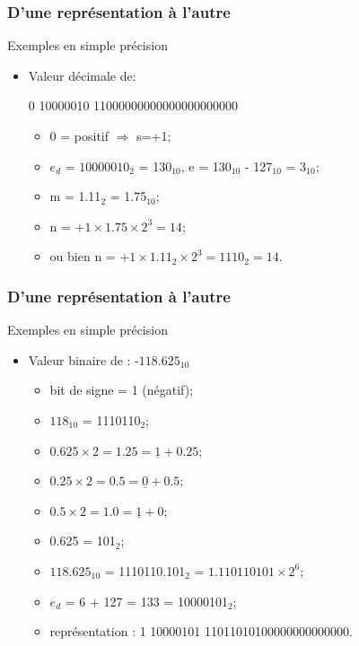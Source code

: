 \documentclass{beamer}
\begin{document}
\begin{frame}
\frametitle{D'une représentation à l'autre}

\begin{block}{Exemples en simple précision}
\begin{itemize}
\item Valeur décimale de:\\
\begin{center}
  0 10000010 11000000000000000000000
  \end{center}
\begin{itemize}
\item 0 = positif $\Rightarrow$ s=+1;
\item $e_d$ = $10000010_2$ = 130$_{10}$, e = 130$_{10}$ - 127$_{10}$ =
  $3_{10}$;
\item m = 1.11$_2$ = 1.75$_{10}$;
\item n = $+1 \times{}  1.75\times{}2^3=14$;
  \item ou bien n = $+1 \times{} 1.11_2\times{}2^3=1110_2=14$.
\end{itemize}
\end{itemize}
\end{block}
\end{frame}

\begin{frame}
\frametitle{D'une représentation à l'autre}

\begin{block}{Exemples en simple précision}
\begin{itemize}
\item Valeur binaire de : -$118.625_{10}$
\begin{itemize}
\item bit de signe = 1 (négatif);
\item $118_{10}$ = 1110110$_2$;
\item $0.625\times{}2=1.25=\underline{1}+0.25$;
\item $0.25\times{}2=0.5=\underline{0}+0.5$;
\item $0.5\times{}2=1.0=\underline{1}+0$;
\item 0.625 = 101$_2$;
\item $118.625_{10}$ = 1110110.101$_2$ = $1.110110101\times{}2^6$;
\item $e_d$ = 6 + 127 = 133 = 10000101$_2$;
\item représentation : 1 10000101 11011010100000000000000.
\end{itemize}
\end{itemize}
\end{block}
\end{frame}
\end{document}
